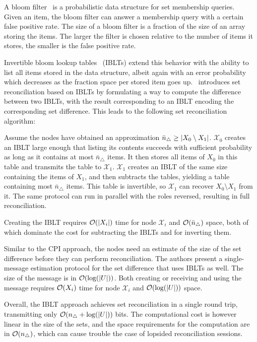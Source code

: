 A bloom filter~\cite{bloom1970space} is a probabilistic data structure for set membership queries. Given an item, the bloom filter can answer a membership query with a certain false positive rate. The size of a bloom filter is a fraction of the size of an array storing the items. The larger the filter is chosen relative to the number of items it stores, the smaller is the false positive rate.

Invertible bloom lookup tables~\cite{goodrich2011invertible} (IBLTs) extend this behavior with the ability to list all items stored in the data structure, albeit again with an error probability which decreases as the fraction space per stored item goes up. \cite{eppstein2011s}~introduces set reconciliation based on IBLTs by formulating a way to compute the difference between two IBLTs, with the result corresponding to an IBLT encoding the corresponding set difference. This leads to the following set reconciliation algorithm:

Assume the nodes have obtained an approximation $\bar{n}_{\triangle} \geq |{X_0 \setminus X_1}|$. $\mathcal{X}_0$ creates an IBLT large enough that listing its contents succeeds with sufficient probability as long as it contains at most $\bar{n}_{\triangle}$ items. It then stores all items of $X_0$ in this table and transmits the table to $\mathcal{X}_1$. $\mathcal{X}_1$ creates an IBLT of the same size containing the items of $X_1$, and then subtracts the tables, yielding a table containing most $\bar{n}_{\triangle}$ items. This table is invertible, so $\mathcal{X}_1$ can recover $X_0 \setminus X_1$ from it. The same protocol can run in parallel with the roles reversed, resulting in full reconciliation.

Creating the IBLT requires $\mathcal{O}(|{X_i}|)$ time for node $\mathcal{X}_i$ and $\mathcal{O}(\bar{n}_{\triangle})$ space, both of which dominate the cost for subtracting the IBLTs and for inverting them.

Similar to the CPI approach, the nodes need an estimate of the size of the set difference before they can perform reconciliation. The authors present a single-message estimation protocol for the set difference that uses IBLTs as well. The size of the message is in $\mathcal{O}(\log(|{U}|))$. Both creating or receiving and using the message requires $\mathcal{O}(X_i)$ time for node $\mathcal{X}_i$ and $\mathcal{O}(\log(|{U}|))$ space.

Overall, the IBLT approach achieves set reconciliation in a single round trip, transmitting only $\mathcal{O}(n_{\triangle} + \log(|{U}|))$ bits. The computational cost is however linear in the size of the sets, and the space requirements for the computation are in $\mathcal{O}(n_{\triangle})$, which can cause trouble the case of lopsided reconciliation sessions.

